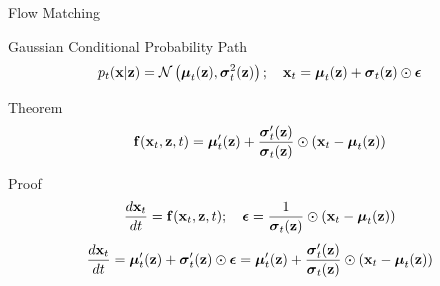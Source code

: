 \documentclass{beamer}
\begin{document}
\begin{frame}{Flow Matching}
	\begin{block}{Gaussian Conditional Probability Path}
		\vspace{-0.3cm}
		\[
			p_t(\bx | \bz) = \cN\left(\bmu_t(\bz), \bsigma_t^2(\bz)\right); \quad \bx_t = \bmu_t(\bz) + \bsigma_t(\bz) \odot \bepsilon
		\]
		\vspace{-0.5cm}
	\end{block}
	\begin{block}{Theorem}
		\vspace{-0.3cm}
		\[
			\bff(\bx_t, \bz, t) =  \bmu_t'(\bz) + \frac{\bsigma_t'(\bz)}{\bsigma_t(\bz)} \odot (\bx_t - \bmu_t(\bz))
		\]
		\vspace{-0.3cm}
	\end{block}
	\vspace{-0.2cm}
	\begin{block}{Proof}
	\vspace{-0.2cm}
	\[
		\frac{d\bx_t}{dt} = \bff(\bx_t, \bz, t); \quad \bepsilon = \frac{1}{\bsigma_t(\bz)} \odot (\bx_t - \bmu_t(\bz))
	\]
	\[
		\frac{d\bx_t}{dt} = \bmu_t'(\bz) + \bsigma_t'(\bz) \odot \bepsilon =  \bmu_t'(\bz) + \frac{\bsigma_t'(\bz)}{\bsigma_t(\bz)} \odot (\bx_t - \bmu_t(\bz))
	\]
	\end{block}
\end{frame}
\end{document}
